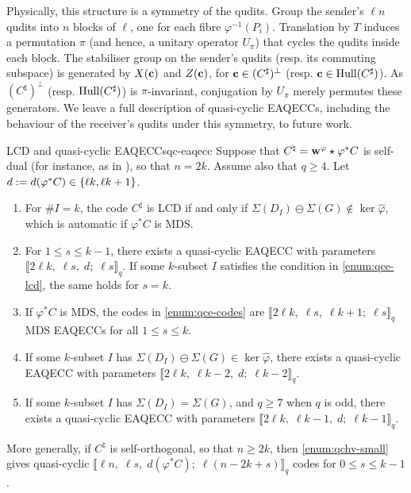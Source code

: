 \documentclass[twocolumn, 11pt]{scrartcl}
\begin{document}
Physically, this structure is a symmetry of the qudits. Group the sender's $\ell n$ qudits into $n$ blocks of $\ell$, one for each fibre $\varphi^{-1}(P_i)$. Translation by $T$ induces a permutation $\pi$ (and hence, a unitary operator $U_\pi$) that cycles the qudits inside each block. The stabiliser group on the sender's qudits (resp. its commuting subspace) is generated by $X(\mathbf{c})$ and $Z(\mathbf{c})$, for $\mathbf{c}\in(C^\sharp)^\perp$ (resp. $\mathbf{c}\in\operatorname{Hull}(C^\sharp)$). As $(C^\sharp)^\perp$ (resp. $\operatorname{Hull}(C^\sharp)$) is $\pi$-invariant, conjugation by $U_\pi$ merely permutes these generators. We leave a full description of quasi-cyclic EAQECCs, including the behaviour of the receiver's qudits under this symmetry, to future work.

\begin{corollary}{LCD and quasi-cyclic EAQECCs}{qc-eaqecc}
    Suppose that $C^\natural=\mathbf{w}^\varphi\star\varphi^*C$ is self-dual (for instance, as in ), so that $n=2k$. Assume also that $q\geq4$. Let $d:=d(\varphi^*C)\in\{\ell k,\ell k+1\}$.
    \begin{enumerate}[label={(\alph*)}]
        \item \label{enum:qce-lcd} For $\#I=k$, the code $C^\sharp$ is LCD if and only if $\Sigma(D_I)\ominus\Sigma(G)\notin\ker\hat\varphi$, which is automatic if $\varphi^*C$ is MDS.
        \item \label{enum:qce-codes} For $1\leq s\leq k-1$, there exists a quasi-cyclic EAQECC with parameters $\llbracket2\ell k,\;\ell s,\;d;\;\ell s\rrbracket_q$. If some $k$-subset $I$ satisfies the condition in \ref{enum:qce-lcd}, the same holds for $s=k$.
        \item \label{enum:qce-mds} If $\varphi^*C$ is MDS, the codes in \ref{enum:qce-codes} are $\llbracket2\ell k,\;\ell s,\;\ell k+1;\;\ell s\rrbracket_q$ MDS EAQECCs for all $1\leq s\leq k$.
        \item \label{enum:qce-hull2} If some $k$-subset $I$ has $\Sigma(D_I)\ominus\Sigma(G)\in\ker\hat\varphi$, there exists a quasi-cyclic EAQECC with parameters $\llbracket2\ell k,\;\ell k-2,\;d;\;\ell k-2\rrbracket_q$.
        \item \label{enum:qce-hull1} If some $k$-subset $I$ has $\Sigma(D_I)=\Sigma(G)$, and $q\geq7$ when $q$ is odd, there exists a quasi-cyclic EAQECC with parameters $\llbracket2\ell k,\;\ell k-1,\;d;\;\ell k-1\rrbracket_q$.
    \end{enumerate}
    More generally, if $C^\natural$ is self-orthogonal, so that $n\geq2k$, then \ref{enum:qchv-small} gives quasi-cyclic $\llbracket\ell n,\;\ell s,\;d(\varphi^*C);\;\ell(n-2k+s)\rrbracket_q$ codes for $0\leq s\leq k-1$.
\end{corollary}
\end{document}
